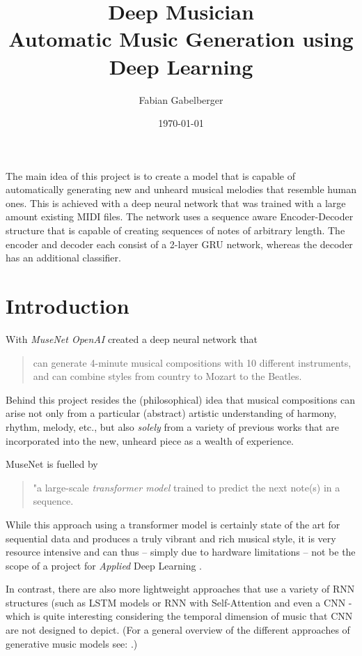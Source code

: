 \documentclass[a4paper, 10pt, xcolor=dvipsnames]{article} %
\date{\vspace{-9ex}} %
\title{Deep Musician
\vspace{0.25em}
\\ \large Automatic Music Generation using Deep Learning
}
\author{Fabian Gabelberger}
\date{\today}
\renewenvironment{abstract}
 {\small
  \begin{center}
  \bfseries \abstractname\vspace{-.5em}\vspace{0pt}
  \end{center}
  \list{}{
    \setlength{\leftmargin}{3cm}%
    \setlength{\rightmargin}{\leftmargin}%
  }%
  \item\relax}
 {\endlist}
\begin{document}
\maketitle
\vspace{2em}

\begin{abstract}
  The main idea of this project is to create a model that is capable of
  automatically generating new and unheard musical melodies that resemble human
  ones. This is achieved with a deep neural network that was trained with a
  large amount existing MIDI files. The network uses a sequence aware
  Encoder-Decoder structure that is capable of creating sequences of notes of
  arbitrary length. The encoder and decoder each consist of a 2-layer GRU
  network, whereas the decoder has an additional classifier.
\end{abstract}

\section{Introduction}
With \emph{MuseNet OpenAI} created a deep neural network that
\blockcquote{payne2019}{can generate 4-minute musical compositions with 10
  different instruments, and can combine styles from country to Mozart to the
  Beatles.} Behind this project resides the (philosophical) idea that musical
compositions can arise not only from a particular (abstract) artistic
understanding of harmony, rhythm, melody, etc., but also \emph{solely} from a
variety of previous works that are incorporated into the new, unheard piece as
a wealth of experience.

MuseNet is fuelled by \blockcquote{payne2019}{"a large-scale \emph{transformer
    model} trained to predict the next note(s) in a sequence.} While this
approach using a transformer model is certainly state of the art for
sequential data and produces a truly vibrant and rich musical style, it is
very resource intensive and can thus -- simply due to hardware limitations
-- not be the scope of a project for \emph{Applied} Deep Learning .

In contrast, there are also more lightweight approaches that use a variety of
RNN structures (such as LSTM models or RNN \cite{lewandowski2012,
  jedrzejewska2018, hewahi2019, ycart2017, mangal2019} with Self-Attention
\cite{jagannathan2022} and even a CNN \cite{yang2017} - which is quite
interesting considering the temporal dimension of music that CNN are not
designed to depict. (For a general overview of the different approaches of
generative music models see: \cite{briot2017}.)
\end{document}
